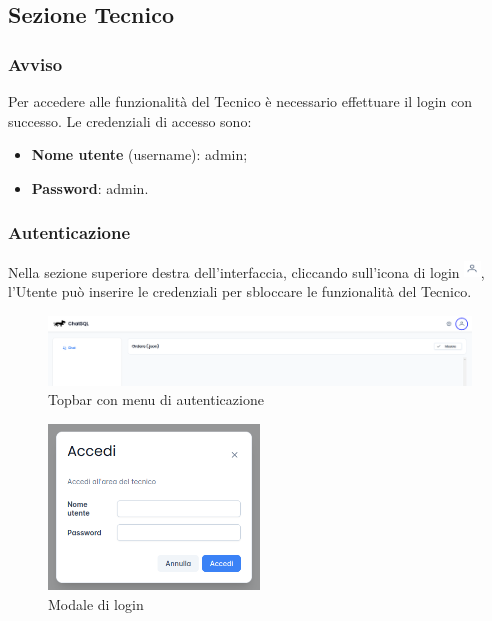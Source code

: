 \subsection{Sezione Tecnico}
\label{sec:sezTecnico}

\subsubsection*{Avviso}
Per accedere alle funzionalità del Tecnico è necessario effettuare il login con successo. Le credenziali di accesso sono:
\begin{itemize}
    \item \textbf{Nome utente} (username): admin;
    \item \textbf{Password}: admin. 
\end{itemize}

\subsubsection{Autenticazione} \label{sec:autenticazione}
Nella sezione superiore destra dell'interfaccia, cliccando sull'icona di login \includegraphics[height=1.2em]{assets/user_icon.png}, l'Utente può inserire le credenziali per sbloccare le funzionalità del Tecnico.
\begin{figure}[H]
  \centering
  \includegraphics[width=1\textwidth]{assets/login_topbar.png}
  \caption{Topbar con menu di autenticazione}
\end{figure}
\begin{figure}[H]
  \centering
  \includegraphics[width=0.50\textwidth]{assets/login_modal.png}
  \caption{Modale di login}
\end{figure}

